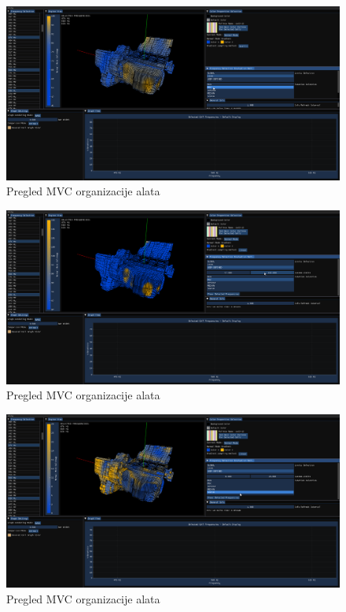 \documentclass[times, utf8, diplomski]{fer}
\begin{document}
\begin{figure} [H]
	\centering
    \includegraphics[width=\textwidth]{demonstration/max_quartic.png}
    \caption{Pregled MVC organizacije alata}
    \label{fig:high-level-overview}
\end{figure}

\begin{figure} [H]
	\centering
    \includegraphics[width=\textwidth]{demonstration/custom_limits_linear_sampling.png}
    \caption{Pregled MVC organizacije alata}
    \label{fig:high-level-overview}
\end{figure}

\begin{figure} [H]
	\centering
    \includegraphics[width=\textwidth]{demonstration/spread.png}
    \caption{Pregled MVC organizacije alata}
    \label{fig:high-level-overview}
\end{figure}
\end{document}

